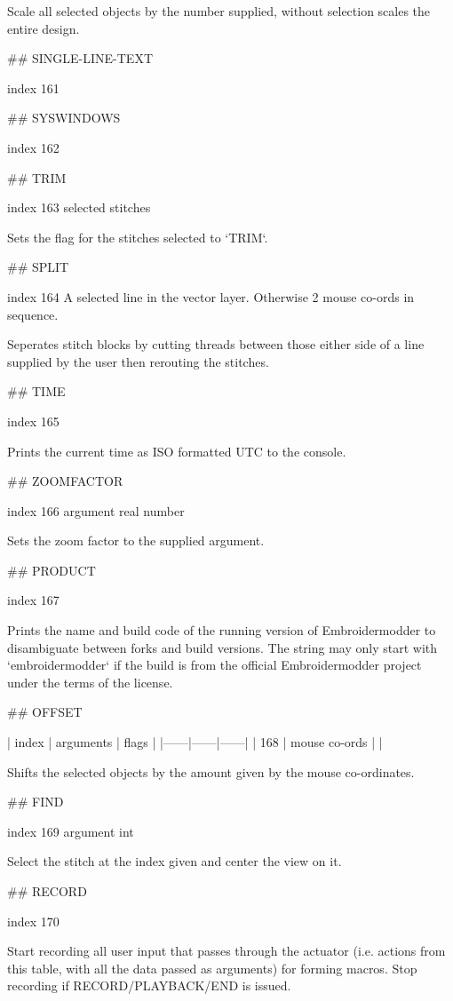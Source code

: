 Scale all selected objects by the number supplied, without selection scales the
entire design.

## SINGLE-LINE-TEXT

index 161



## SYSWINDOWS

index 162


## TRIM

index 163
selected stitches 

Sets the flag for the stitches selected to `TRIM`.

## SPLIT

index 164
A selected line in the vector layer. Otherwise 2 mouse co-ords in sequence.

Seperates stitch blocks by cutting threads between those either side of a line
supplied by the user then rerouting the stitches.

## TIME

index 165

Prints the current time as ISO formatted UTC to the console.

## ZOOMFACTOR

index 166 argument real number

Sets the zoom factor to the supplied argument.

## PRODUCT

index 167

Prints the name and build code of the running version of Embroidermodder to
disambiguate between forks and build versions. The string may only start with
`embroidermodder` if the build is from the official Embroidermodder project
under the terms of the license.

## OFFSET

| index | arguments | flags |
|------|------|------|
| 168 | mouse co-ords | |

Shifts the selected objects by the amount given by the mouse co-ordinates.

## FIND

index 169 argument int

Select the stitch at the index given and center the view on it.

## RECORD

index 170

Start recording all user input that passes through the actuator (i.e. actions
from this table, with all the data passed as arguments) for forming macros. Stop
recording if RECORD/PLAYBACK/END is issued.

